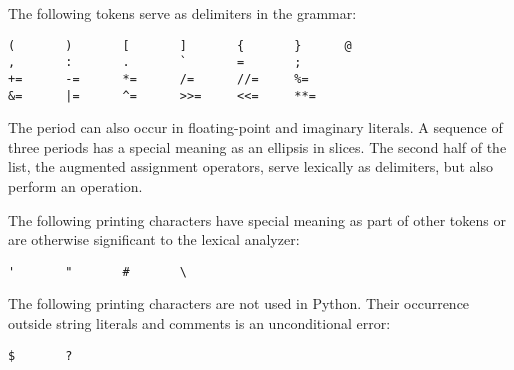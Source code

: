 The following tokens serve as delimiters in the grammar:

\begin{verbatim}
(       )       [       ]       {       }      @
,       :       .       `       =       ;
+=      -=      *=      /=      //=     %=
&=      |=      ^=      >>=     <<=     **=
\end{verbatim}

The period can also occur in floating-point and imaginary literals.  A
sequence of three periods has a special meaning as an ellipsis in slices.
The second half of the list, the augmented assignment operators, serve
lexically as delimiters, but also perform an operation.

The following printing \ASCII{} characters have special meaning as part
of other tokens or are otherwise significant to the lexical analyzer:

\begin{verbatim}
'       "       #       \
\end{verbatim}

The following printing \ASCII{} characters are not used in Python.  Their
occurrence outside string literals and comments is an unconditional
error:

\begin{verbatim}
$       ?
\end{verbatim}
